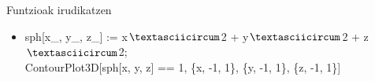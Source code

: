 \documentclass[xcolor=x11names,table]{beamer}
\begin{document}
\begin{frame}{Funtzioak irudikatzen}
\begin{itemize}

\item<1->  sph[x\_, y\_, z\_] := x$\textasciicircum$2 + y$\textasciicircum$2 + z$\textasciicircum$2;\\ 
           ContourPlot3D[sph[x, y, z] == 1, \{x, -1, 1\}, \{y, -1, 1\}, \{z, -1, 1\}]

\end{itemize}
\begin{center}
\end{center}
\end{frame}
\end{document}
